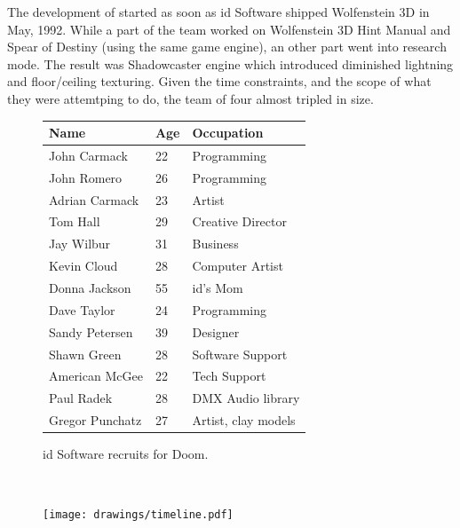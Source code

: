 The development of \doom started as soon as id Software shipped Wolfenstein 3D in May, 1992. While a part of the team worked on Wolfenstein 3D Hint Manual and Spear of Destiny (using the same game engine), an other part went into research mode. The result was Shadowcaster engine which introduced diminished lightning and floor/ceiling texturing. Given the time constraints, and the scope of what they were attemtping to do, the team of four almost tripled in size.\\
\par
 \begin{figure}[H]
\centering  
\begin{tabularx}{\textwidth}{ X  X  X  }
  \toprule
  \textbf{Name} &  \textbf{Age} & \textbf{Occupation} \\
  \toprule 
   John Carmack & 22 &  Programming\\
   John Romero & 26 &  Programming\\
   Adrian Carmack & 23 &  Artist\\
   Tom Hall\protect\footnotemark  & 29 &  Creative Director\\
   Jay Wilbur & 31 &  Business\\
   Kevin Cloud& 28 &  Computer Artist\\
   Donna Jackson & 55 & id's Mom\\   
   Dave Taylor & 24 & Programming\\
   Sandy Petersen & 39 & Designer\\
   Shawn Green & 28 & Software Support\\
   American McGee & 22 & Tech Support\\
   Paul Radek & 28 & DMX Audio library\\
   Gregor Punchatz & 27 & Artist, clay models\\

     \toprule
\end{tabularx}
\caption{id Software recruits for Doom.}\label{fig:Id Software team}
\end{figure}
\\


\par
\begin{figure}[H]
\centering
\texttt{[image: drawings/timeline.pdf]}
\end{figure}
\par




